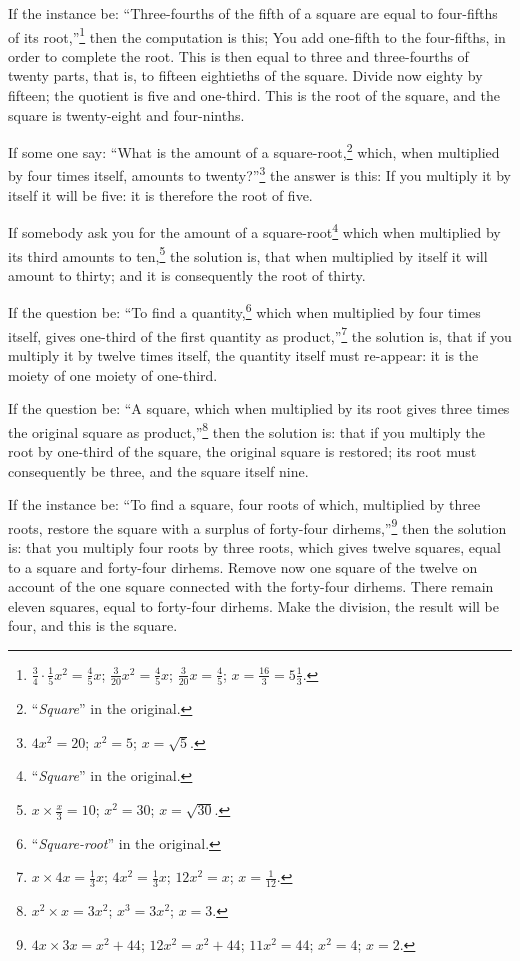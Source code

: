 If the instance be: ``Three-fourths of the fifth of a square are equal to four-fifths of its root,''\footnote{$\frac{3}{4} \cdot \frac{1}{5}x^2 = \frac{4}{5}x$; $\frac{3}{20}x^2 = \frac{4}{5}x$; $\frac{3}{20}x = \frac{4}{5}$; $x = \frac{16}{3} = 5\frac{1}{3}$.} then the computation is this; You add one-fifth to the four-fifths, in order to complete the root. This is then equal to three and three-fourths of twenty parts, that is, to fifteen eightieths of the square. Divide now eighty by fifteen; the quotient is five and one-third. This is the root of the square, and the square is twenty-eight and four-ninths.

If some one say: ``What is the amount of a square-root,\footnote{``\textit{Square}'' in the original.} which, when multiplied by four times itself, amounts to twenty?''\footnote{$4x^2 = 20$; $x^2 = 5$; $x = \sqrt{5}$.} the answer is this: If you multiply it by itself it will be five: it is therefore the root of five.

If somebody ask you for the amount of a square-root\footnote{``\textit{Square}'' in the original.} which when multiplied by its third amounts to ten,\footnote{$x \times \frac{x}{3} = 10$; $x^2 = 30$; $x = \sqrt{30}$.} the solution is, that when multiplied by itself it will amount to thirty; and it is consequently the root of thirty.

If the question be: ``To find a quantity,\footnote{``\textit{Square-root}'' in the original.} which when multiplied by four times itself, gives one-third of the first quantity as product,''\footnote{$x \times 4x = \frac{1}{3}x$; $4x^2 = \frac{1}{3}x$; $12x^2 = x$; $x = \frac{1}{12}$.} the solution is, that if you multiply it by twelve times itself, the quantity itself must re-appear: it is the moiety of one moiety of one-third.

If the question be: ``A square, which when multiplied by its root gives three times the original square as product,''\footnote{$x^2 \times x = 3x^2$; $x^3 = 3x^2$; $x = 3$.} then the solution is: that if you multiply the root by one-third of the square, the original square is restored; its root must consequently be three, and the square itself nine.

If the instance be: ``To find a square, four roots of which, multiplied by three roots, restore the square with a surplus of forty-four dirhems,''\footnote{$4x \times 3x = x^2 + 44$; $12x^2 = x^2 + 44$; $11x^2 = 44$; $x^2 = 4$; $x = 2$.} then the solution is: that you multiply four roots by three roots, which gives twelve squares, equal to a square and forty-four dirhems. Remove now one square of the twelve on account of the one square connected with the forty-four dirhems. There remain eleven squares, equal to forty-four dirhems. Make the division, the result will be four, and this is the square.

